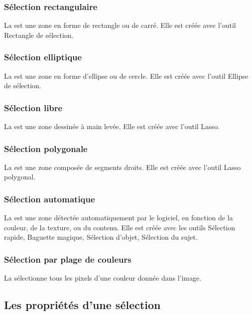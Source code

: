 \subsubsection{Sélection rectangulaire}

La  est une zone en forme de rectangle ou de carré. Elle est créée avec l'outil Rectangle de sélection.

\subsubsection{Sélection elliptique}

La  est une zone en forme d'ellipse ou de cercle. Elle est créée avec l'outil Ellipse de sélection.

\subsubsection{Sélection libre}

La  est une zone dessinée à main levée. Elle est créée avec l'outil Lasso.

\subsubsection{Sélection polygonale}

La  est une zone composée de segments droits. Elle est créée avec l'outil Lasso polygonal.

\subsubsection{Sélection automatique}

La  est une zone détectée automatiquement par le logiciel, en fonction de la couleur, de la texture, ou du contenu. Elle est créée avec les outils Sélection rapide, Baguette magique, Sélection d'objet, Sélection du sujet.

\subsubsection{Sélection par plage de couleurs}

La  sélectionne tous les pixels d'une couleur donnée dans l'image.

\subsection{Les propriétés d'une sélection}

